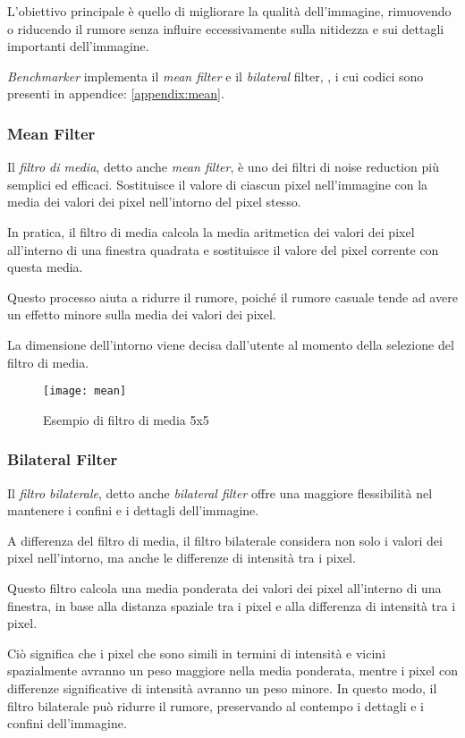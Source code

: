 L'obiettivo principale è quello di migliorare la qualità dell'immagine, rimuovendo o riducendo il rumore senza influire eccessivamente sulla nitidezza e sui dettagli importanti dell'immagine.

\textit{Benchmarker} implementa il \textit{mean filter} e il \textit{bilateral} filter, , i cui codici sono presenti in appendice: \ref{appendix:mean}.

\subsubsection{Mean Filter}
Il \textit{filtro di media}, detto anche \textit{mean filter}, è uno dei filtri di noise reduction più semplici ed efficaci. Sostituisce il valore di ciascun pixel nell'immagine con la media dei valori dei pixel nell'intorno del pixel stesso.

In pratica, il filtro di media calcola la media aritmetica dei valori dei pixel all'interno di una finestra quadrata e sostituisce il valore del pixel corrente con questa media.

Questo processo aiuta a ridurre il rumore, poiché il rumore casuale tende ad avere un effetto minore sulla media dei valori dei pixel.

La dimensione dell'intorno viene decisa dall'utente al momento della selezione del filtro di media.

\begin{figure}[H]
	\centering
	\texttt{[image: mean]}
	\caption{Esempio di filtro di media 5x5}
\end{figure}

\subsubsection{Bilateral Filter}
Il \textit{filtro bilaterale}, detto anche \textit{bilateral filter} offre una maggiore flessibilità nel mantenere i confini e i dettagli dell'immagine. 

A differenza del filtro di media, il filtro bilaterale considera non solo i valori dei pixel nell'intorno, ma anche le differenze di intensità tra i pixel.

Questo filtro calcola una media ponderata dei valori dei pixel all'interno di una finestra, in base alla distanza spaziale tra i pixel e alla differenza di intensità tra i pixel.

Ciò significa che i pixel che sono simili in termini di intensità e vicini spazialmente avranno un peso maggiore nella media ponderata, mentre i pixel con differenze significative di intensità avranno un peso minore. In questo modo, il filtro bilaterale può ridurre il rumore, preservando al contempo i dettagli e i confini dell'immagine.

